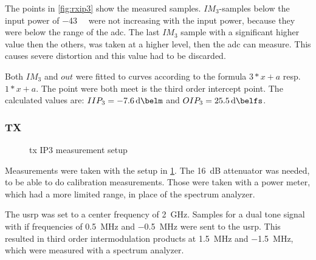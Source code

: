 \documentclass[12pt,a4paper,parskip=full,abstracton]{scrartcl}
\begin{document}
The points in \cref{fig:rxip3} show the measured samples. $IM_3$-samples
below the input power of \SI{-43}{\deci\belm} were not increasing with the input
power, because they were below the range of the \gls{adc}. The last $IM_3$ sample
with a significant higher value then the others, was taken at a higher level, then
the \gls{adc} can measure. This causes severe distortion and this value had to be
discarded.

Both $IM_3$ and $out$ were fitted to curves according to the formula $3*x+a$ resp.
$1*x+a$. The point were both meet is the third order intercept point. The calculated
values are: $IIP_3 = \SI{-7.6}{\deci\belm}$ and $OIP_3 = \SI{25.5}{\deci\belfs}$.

\subsubsection{TX}
\label{sec:iptx}
\begin{figure}[htb]
    \centering
    \caption{\gls{tx} IP3 measurement setup}
    \label{fig:txipsetup}
\end{figure}

Measurements were taken with the setup in \cref{fig:txipsetup}. The \SI{16}{\deci\bel}
attenuator was needed, to be able to do calibration measurements. Those were taken with
a power meter, which had a more limited range, in place of the spectrum analyzer.

The \gls{usrp} was set to a center frequency of \SI{2}{\giga\hertz}. Samples for a dual
tone signal with \gls{if} frequencies of \SI{+0.5}{\mega\hertz} and \SI{-0.5}{\mega\hertz}
were sent to the \gls{usrp}. This resulted in third order intermodulation products at
\SI{+1.5}{\mega\hertz} and \SI{-1.5}{\mega\hertz}, which were measured with a spectrum analyzer.
\end{document}

